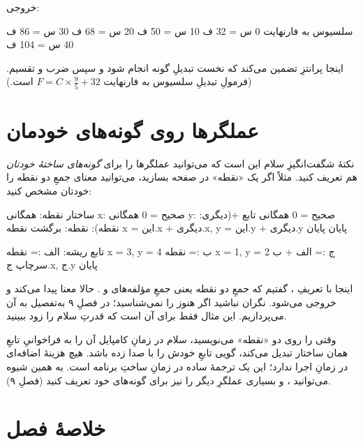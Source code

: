 خروجی:

\begin{salamen}[language={}]
سلسیوس به فارنهایت
0 س = 32 ف
10 س = 50 ف
20 س = 68 ف
30 س = 86 ف
40 س = 104 ف
\end{salamen}

اینجا پرانتزِ  تضمین می‌کند که نخست تبدیلِ گونه انجام
شود و سپس ضرب و تقسیم. (فرمولِ تبدیلِ سلسیوس به فارنهایت
$F = C \times \frac{9}{5} + 32$ است.)

\section{عملگرها روی گونه‌های خودمان}

نکتهٔ شگفت‌انگیزِ سلام این است که می‌توانید عملگرها را برای \emph{گونه‌های
ساختهٔ خودتان} هم تعریف کنید. مثلاً اگر یک «نقطه» در صفحه بسازید، می‌توانید
معنای جمعِ دو نقطه را خودتان مشخص کنید:

\begin{salamfa}
ساختار نقطه:
    همگانی x: صحیح = 0
    همگانی y: صحیح = 0
    همگانی تابع +(دیگری: نقطه): نقطه:
        برگشت نقطه { x = این.x + دیگری.x, y = این.y + دیگری.y }
    پایان
پایان

تابع ریشه:
    الف := نقطه { x = 3, y = 4 }
    ب := نقطه { x = 1, y = 2 }
    ج := الف + ب
    سرچاپ ج.x, ج.y
پایان
\end{salamfa}

اینجا با تعریفِ ، گفتیم که جمعِ دو نقطه یعنی جمعِ مؤلفه‌های
 و . حالا  معنا پیدا می‌کند و خروجی 
می‌شود. نگران نباشید اگر هنوز  را نمی‌شناسید؛ در فصلِ ۹ به‌تفصیل
به آن می‌پردازیم. این مثال فقط برای آن است که قدرتِ سلام را زود ببینید.

\begin{deep}
وقتی  را روی دو «نقطه» می‌نویسید، سلام در زمانِ کامپایل آن را به
فراخوانیِ تابعِ \code{+} همان ساختار تبدیل می‌کند، گویی
 تابعِ \code{+} خودش را با  صدا زده باشد. هیچ هزینهٔ اضافه‌ای در زمانِ اجرا ندارد؛ این یک ترجمهٔ
ساده در زمانِ ساختِ برنامه است. به همین شیوه می‌توانید \code{==}، \code{*} و
بسیاری عملگرِ دیگر را نیز برای گونه‌های خود تعریف کنید (فصلِ ۹).
\end{deep}

\section{خلاصهٔ فصل}


